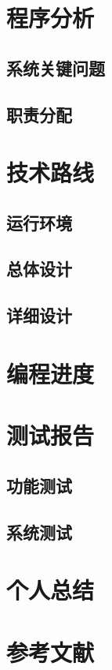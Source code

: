 \documentclass{article}
\begin{document}
\section{程序分析}
\subsection{ 系统关键问题}

\subsection{ 职责分配}

\section{技术路线}
\subsection{ 运行环境}

\subsection{总体设计}

\subsection{详细设计}

\section{编程进度}


\section{测试报告}
\subsection{功能测试}

\subsection{系统测试}

\section{个人总结}

\section{参考文献}
\end{document}
